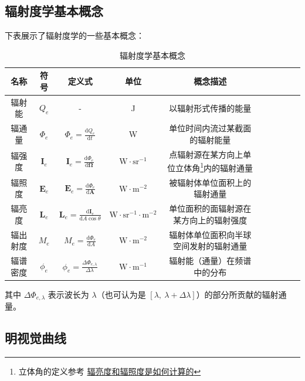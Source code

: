 \documentclass[UTF8]{report}
\theoremstyle{MyLineTheoremStyle} %
\theoremstyle{MyBlockTheoremStyle} %
\theoremstyle{MySubsubsectionStyle} %
\begin{document}
\subsection{辐射度学基本概念}
下表展示了辐射度学的一些基本概念：
\begin{table}[H]\centering
    \caption{辐射度学基本概念}
    \label{辐射度学基本概念}
    \renewcommand{\arraystretch}{1.1} %
\begin{tabular}{|c|c|c|c|c|c|c|c|c|c|}\hline
    名称 & 符号& 定义式 & 单位 & 概念描述\\
    \hline
    辐射能 & $Q_e$ & - & J & 以辐射形式传播的能量 \\
    \hline
    辐通量 & $\Phi_e$ & $\Phi_e = \frac{\mathrm{d}Q_e}{\mathrm{d}t}$ & W & 单位时间内流过某截面的辐射能量 \\
    \hline
    辐强度 & $\boldsymbol{I}_e$ & $\boldsymbol{I}_e = \frac{\mathrm{d}\Phi_e }{\mathrm{d} \boldsymbol{\Omega} } $ & $\mathrm{W\cdot sr^{-1}}$ & 点辐射源在某方向上单位立体角\footnote{立体角的定义参考 \href{https://www.zhihu.com/question/611533175/answer/3244345528}{辐亮度和辐照度是如何计算的}}内的辐射通量 \\
    \hline
    辐照度 & $\boldsymbol{E}_e$ & $ \boldsymbol{E}_e = \frac{\mathrm{d}\Phi_e}{\mathrm{d}\boldsymbol{A}}$ & $\mathrm{W\cdot m^{-2}}$ & 被辐射体单位面积上的辐射通量 \\
    \hline
    辐亮度 & $\boldsymbol{L}_e$ & $\boldsymbol{L}_e = \frac{\mathrm{d}\boldsymbol{I}_e}{\mathrm{d}A \cos \theta} $ & $\mathrm{\mathrm{W}\cdot sr^{-1}\cdot m^{-2}}$ & 单位面积的面辐射源在某方向上的辐射强度\\
    \hline
    辐出射度 & $M_e$ & $ M_e = \frac{\mathrm{d}\Phi_e}{\mathrm{d}A}$ & $\mathrm{W\cdot m^{-2}} $ & 辐射体单位面积向半球空间发射的辐射通量 \\
    \hline
    辐谱密度 & $\phi_e$ & $\phi_e = \frac{\Delta \Phi_{e,\lambda}}{ \Delta\lambda} $ & $\mathrm{W\cdot m^{-1}} $ & 辐射能（通量）在频谱中的分布 \\
    \hline
\end{tabular}
\end{table}

其中 $\Delta \Phi_{e,\lambda}$ 表示波长为 $\lambda$（也可认为是 $[\lambda,\ \lambda + \Delta \lambda]$）的部分所贡献的辐射通量。

\subsection{明视觉曲线}
\end{document}
